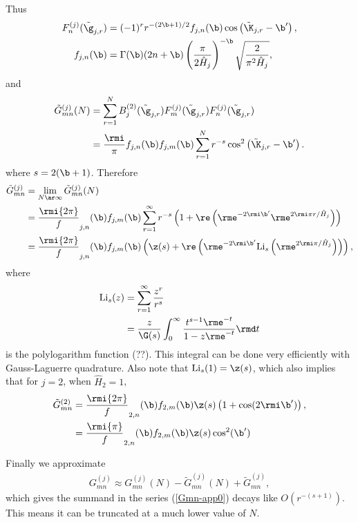 \documentclass[a4paper,10pt]{article}
\begin{document}
Thus
\begin{subequations}
\begin{align}
F_n^{(j)}(\tilde \g_{j,r})&=
(-1)^{r}r^{-(2\b+1)/2}f_{j,n}(\b)\cos\left(\tilde\K_{j,r}-\b'\right),\\
f_{j,n}(\b)&=\Gamma(\b)(2n+\b)\left(\frac\pi{2\hat H_{j}}\right)^{-\b}
\sqrt{\frac2{\pi^{2}\hat H_{j} }},
\end{align}
\end{subequations}
and
\begin{align}\label{Gmn-app0}
\tilde G_{mn}^{(j)}(N)
 &=\sum_{r=1}^{N}B_j^{(2)}(\tilde\g_{j,r})F_m^{(j)}(\tilde\g_{j,r})F^{(j)}_n(\tilde\g_{j,r})
 \notag\\
 &=\frac\rmi\pi f_{j,n}(\b)f_{j,m}(\b)\sum_{r=1}^{N}r^{-s}
 \cos^{2}\left(\tilde\K_{j,r}-\b'\right).
 \end{align}
where $s=2(\b+1)$.
Therefore
\begin{align}\label{Gmn-app}
\tilde G_{mn}^{(j)}
&=\lim_{N\ar\infty}\tilde G_{mn}^{(j)}(N)
\notag\\
 &=\frac\rmi{2\pi} f_{j,n}(\b)f_{j,m}(\b)\sum_{r=1}^{\infty}r^{-s}
 \left (1+\re\left (\rme^{-2\rmi\b'} \rme^{2\rmi\pi r/\hat H_{j}}\right)\right)
\notag\\
 &=\frac\rmi{2\pi} f_{j,n}(\b)f_{j,m}(\b)
 \left ( \z(s)+\re\left (\rme^{-2\rmi\b'}{\rm Li}_{s} \left(\rme^{2\rmi\pi /\hat H_{j}}\right)\right)\right),
 \end{align}
 where
\begin{align}
{\rm Li}_{s}(z)&=\sum_{r=1}^{\infty}\frac{z^{r}}{r^{s}}
\notag\\
&=\frac{z}{\G(s)}\int_{0}^{\infty}\frac{t^{s-1}\rme^{-t}}{1-z\rme^{-t}}\rmd t
\end{align}
is the polylogarithm function (??). This integral can be done very efficiently with Gauss-Laguerre quadrature. Also note that ${\rm Li}_{s}(1)=\z(s)$, which also implies that for $j=2$, when $\hat H_{2}=1$,
\begin{align}\label{Gmn-app}
\tilde G_{mn}^{(2)}
&=\frac\rmi{2\pi} f_{2,n}(\b)f_{2,m}(\b)\z(s)
 \left ( 1+\cos(2\rmi\b')\right),
 \notag\\
 &=\frac\rmi{\pi} f_{2,n}(\b)f_{2,m}(\b)\z(s)\cos^{2}(\b')
 \end{align}
 
 Finally we approximate
 \begin{align}
G_{mn}^{(j)}\approx G_{mn}^{(j)}(N)-\tilde G_{mn}^{(j)}(N)+ \tilde G_{mn}^{(j)},
\end{align}
which gives the summand in the series (\ref{Gmn-app0}) decays like $O(r^{-(s+1)})$.
This means it can be truncated at a much lower value of $N$.%



\end{document}
